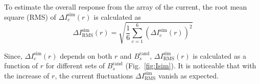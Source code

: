 To estimate the overall response from the array of the current, the root mean square (RMS) of $\Delta I_c^{\text{sim}}(r)$ is calculated as
\begin{equation}\label{eq:delta_Isim_rms}
     \Delta I_{\text{RMS}}^{\text{sim}}(r)= \sqrt{\frac{1}{6}\sum_{c=1}^6 (\Delta I_c^{\text{sim}}(r))^2}
\end{equation}

Since, $\Delta I_c^{\text{sim}}(r)$ depends on both $r$ and $B_s^{\text{rand}}$, $ \Delta I_{\text{RMS}}^{\text{sim}}(r)$  is calculated as a function of $r$ for different sets of $B_s^{\text{rand}}$ (Fig.~\ref{fig:Isim}). It is noticeable that with the increase of $r$, the current fluctuations $\Delta I_{\text{RMS}}^{\text{sim}}$ vanish as expected.




